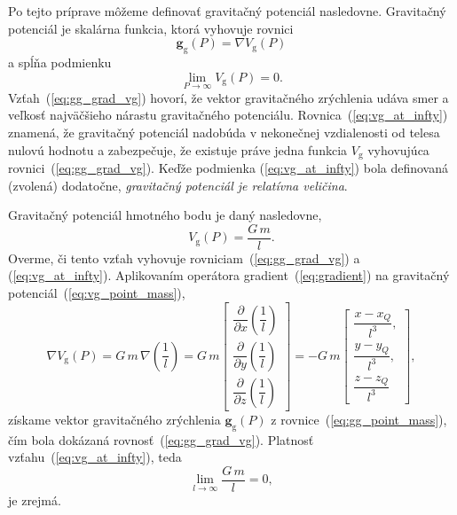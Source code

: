 \documentclass[a4paper, 12pt]{book}
\newcommand{\gidx}{\mathrm g}
\let\vec\mathbf
\begin{document}
Po tejto príprave môžeme definovať gravitačný potenciál nasledovne.  Gravitačný 
potenciál je skalárna funkcia, ktorá vyhovuje rovnici 
\citep{SansoGeoidDetermination}
%
\begin{equation}
\label{eq:gg_grad_vg}
\vec g_\gidx(P) = \nabla V_\gidx(P)
\end{equation}
%
a spĺňa podmienku
%
\begin{equation}
\label{eq:vg_at_infty}
\lim_{P \to \infty} V_\gidx(P) = 0{.}
\end{equation}
%
Vzťah~(\ref{eq:gg_grad_vg}) hovorí, že vektor gravitačného zrýchlenia udáva 
smer a veľkosť najväčšieho nárastu gravitačného potenciálu.  
Rovnica~(\ref{eq:vg_at_infty}) znamená, že gravitačný potenciál nadobúda 
v nekonečnej vzdialenosti od telesa nulovú hodnotu a zabezpečuje, že existuje 
práve jedna funkcia $V_\gidx$ vyhovujúca rovnici~(\ref{eq:gg_grad_vg}).  Keďže 
podmienka (\ref{eq:vg_at_infty}) bola definovaná (zvolená) dodatočne, 
\emph{gravitačný potenciál je relatívna veličina}.

Gravitačný potenciál hmotného bodu je daný nasledovne,
%
\begin{equation}
\label{eq:vg_point_mass}
V_\gidx(P) = \frac{G \, m}{l}{.}
\end{equation}
%
Overme, či tento vzťah vyhovuje rovniciam~(\ref{eq:gg_grad_vg}) 
a (\ref{eq:vg_at_infty}).  Aplikovaním operátora gradient~(\ref{eq:gradient}) 
na gravitačný potenciál~(\ref{eq:vg_point_mass}),
%
\begin{equation}
\nabla V_\gidx(P) = G \, m \, \nabla \left( \frac{1}{l} \right) =
%
G \, m
\begin{bmatrix}
\dfrac{\partial}{\partial x} \left( \dfrac{1}{l} \right)\\[2ex]
\dfrac{\partial}{\partial y} \left( \dfrac{1}{l} \right)\\[2ex]
\dfrac{\partial}{\partial z} \left( \dfrac{1}{l} \right)
\end{bmatrix}
%
=
%
-G \, m
%
\begin{bmatrix}
\dfrac{x - x_Q}{l^3}{,}\\[2ex]
\dfrac{y - y_Q}{l^3}{,}\\[2ex]
\dfrac{z - z_Q}{l^3}
\end{bmatrix}
{,}
\end{equation}
%
získame vektor gravitačného zrýchlenia $\vec g_\gidx(P)$ 
z rovnice~(\ref{eq:gg_point_mass}), čím bola dokázaná 
rovnosť~(\ref{eq:gg_grad_vg}).  Platnosť vzťahu~(\ref{eq:vg_at_infty}), teda
%
\begin{equation}
\lim_{l \to \infty} \frac{G \, m}{l} = 0{,}
\end{equation}
%
je zrejmá.
\end{document}
